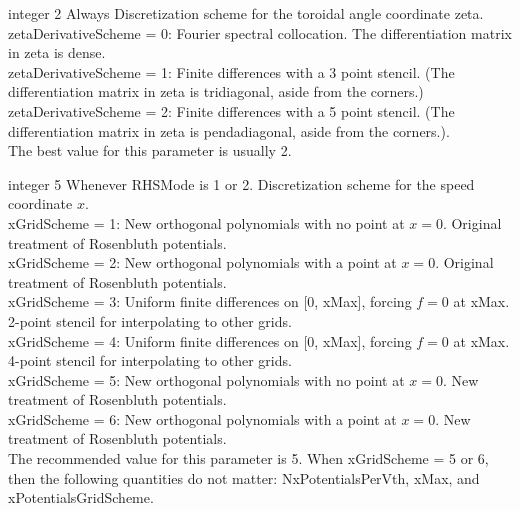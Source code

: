 \myhrule

{integer}
{2}
{Always}
{Discretization scheme for the toroidal angle coordinate zeta.\\

{\ttfamily zetaDerivativeScheme} = 0: Fourier spectral collocation.  The differentiation matrix in zeta is dense.\\

{\ttfamily zetaDerivativeScheme} = 1: Finite differences with a 3 point stencil.  (The differentiation matrix in zeta is tridiagonal, aside from the corners.)\\

{\ttfamily zetaDerivativeScheme} = 2: Finite differences with a 5 point stencil.  (The differentiation matrix in zeta is pendadiagonal, aside from the corners.).\\

The best value for this parameter is usually 2.}

\myhrule

{integer}
{5}
{Whenever {\ttfamily RHSMode} is 1 or 2.}
{Discretization scheme for the speed coordinate $x$.\\

{\ttfamily xGridScheme} = 1: New orthogonal polynomials with no point at $x=0$. Original treatment of Rosenbluth potentials.\\

{\ttfamily xGridScheme} = 2: New orthogonal polynomials with a point at $x=0$. Original treatment of Rosenbluth potentials.\\

{\ttfamily xGridScheme} = 3: Uniform finite differences on [0, {\ttfamily xMax}], forcing $f=0$ at {\ttfamily xMax}. 2-point stencil for interpolating to other grids.\\

{\ttfamily xGridScheme} = 4: Uniform finite differences on [0, {\ttfamily xMax}], forcing $f=0$ at {\ttfamily xMax}. 4-point stencil for interpolating to other grids.\\

{\ttfamily xGridScheme} = 5: New orthogonal polynomials with no point at $x=0$. New treatment of Rosenbluth potentials.\\

{\ttfamily xGridScheme} = 6: New orthogonal polynomials with a point at $x=0$. New treatment of Rosenbluth potentials.\\

The recommended value for this parameter is 5.  
When {\ttfamily xGridScheme} = 5 or 6, then the following quantities do not matter: 
{\ttfamily NxPotentialsPerVth}, {\ttfamily xMax}, and {\ttfamily xPotentialsGridScheme}.}

